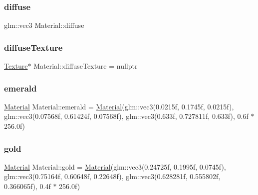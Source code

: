 \mbox{\label{struct_material_a099904e2f5a7bbec3cba6bf8ec546b11}} 
\subsubsection{\texorpdfstring{diffuse}{diffuse}}
{\footnotesize\ttfamily glm\+::vec3 Material\+::diffuse}

\mbox{\label{struct_material_a187af0c557b8521fa0a88507ae618c42}} 
\subsubsection{\texorpdfstring{diffuseTexture}{diffuseTexture}}
{\footnotesize\ttfamily \mbox{\hyperlink{class_texture}{Texture}}$\ast$ Material\+::diffuse\+Texture = nullptr}

\mbox{\label{struct_material_ad6a424d01ca060a25ce520c4dc5b00c2}} 
\subsubsection{\texorpdfstring{emerald}{emerald}}
{\footnotesize\ttfamily \mbox{\hyperlink{struct_material}{Material}} Material\+::emerald = \mbox{\hyperlink{struct_material}{Material}}(glm\+::vec3(0.\+0215f, 0.\+1745f, 0.\+0215f), glm\+::vec3(0.\+07568f, 0.\+61424f, 0.\+07568f), glm\+::vec3(0.\+633f, 0.\+727811f, 0.\+633f), 0.\+6f $\ast$ 256.\+0f)\hspace{0.3cm}{\ttfamily [static]}}

\mbox{\label{struct_material_ae23eaaf9a27a2b9d9a218d1ea3f803e0}} 
\subsubsection{\texorpdfstring{gold}{gold}}
{\footnotesize\ttfamily \mbox{\hyperlink{struct_material}{Material}} Material\+::gold = \mbox{\hyperlink{struct_material}{Material}}(glm\+::vec3(0.\+24725f, 0.\+1995f, 0.\+0745f), glm\+::vec3(0.\+75164f, 0.\+60648f, 0.\+22648f), glm\+::vec3(0.\+628281f, 0.\+555802f, 0.\+366065f), 0.\+4f $\ast$ 256.\+0f)\hspace{0.3cm}{\ttfamily [static]}}

